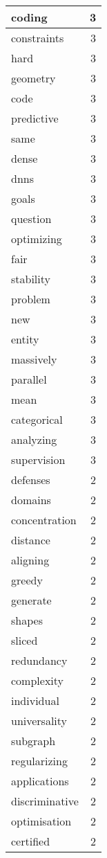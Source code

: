 \begin{table}[h]
\begin{tabular}{|l|r|}
\hline
coding & 3 \\
\hline
constraints & 3 \\
\hline
hard & 3 \\
\hline
geometry & 3 \\
\hline
code & 3 \\
\hline
predictive & 3 \\
\hline
same & 3 \\
\hline
dense & 3 \\
\hline
dnns & 3 \\
\hline
goals & 3 \\
\hline
question & 3 \\
\hline
optimizing & 3 \\
\hline
fair & 3 \\
\hline
stability & 3 \\
\hline
problem & 3 \\
\hline
new & 3 \\
\hline
entity & 3 \\
\hline
massively & 3 \\
\hline
parallel & 3 \\
\hline
mean & 3 \\
\hline
categorical & 3 \\
\hline
analyzing & 3 \\
\hline
supervision & 3 \\
\hline
defenses & 2 \\
\hline
domains & 2 \\
\hline
concentration & 2 \\
\hline
distance & 2 \\
\hline
aligning & 2 \\
\hline
greedy & 2 \\
\hline
generate & 2 \\
\hline
shapes & 2 \\
\hline
sliced & 2 \\
\hline
redundancy & 2 \\
\hline
complexity & 2 \\
\hline
individual & 2 \\
\hline
universality & 2 \\
\hline
subgraph & 2 \\
\hline
regularizing & 2 \\
\hline
applications & 2 \\
\hline
discriminative & 2 \\
\hline
optimisation & 2 \\
\hline
certified & 2 \\

\end{tabular}
\end{table}
